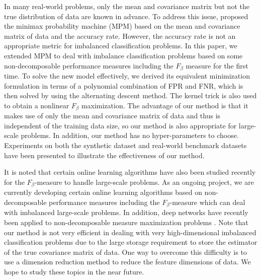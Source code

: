 \documentclass[15pt]{article}
\begin{document}
In many real-world problems, only the mean and covariance matrix but not the true distribution of data are known 
in advance. To address this issue, \cite{Lanckriet2002} proposed the minimax probability machine (MPM) based on 
the mean and covariance matrix of data and the accuracy rate. However, the accuracy rate is not an appropriate 
metric for imbalanced classification problems. In this paper, we extended MPM to deal with imbalance classification 
problems based on some non-decomposable performance measures including the $F_\beta$ measure 
for the first time. To solve the new model effectively, we derived its equivalent minimization formulation in terms 
of a polynomial combination of FPR and FNR, which is then solved by using the alternating descent method.
The kernel trick is also used to obtain a nonlinear $F_\beta$ maximization.
The advantage of our method is that it makes use of only the mean and covariance matrix of data and thus 
is independent of the training data size, so our method is also appropriate for large-scale problems.
In addition, our method has no hyper-parameters to choose.
Experiments on both the synthetic dataset and real-world benchmark datasets have been presented to
illustrate the effectiveness of our method.

It is noted that certain online learning algorithms have also been studied recently for
the $F_\beta$-measure \cite{Narasimhan2015,Busa-Fekete2015,Liu2018} to handle large-scale problems.
As an ongoing project, we are currently developing certain online learning algorithms based on non-decomposable
performance measures including the $F_\beta$-measure which can deal with imbalanced large-scale problems.
In addition, deep networks have recently been applied to non-decomposable measure maximization problems \cite{Sanyal2018}.
Note that our method is not very efficient in dealing with very high-dimensional imbalanced classification problems 
due to the large storage requirement to store the estimator of the true covariance matrix of data. 
One way to overcome this difficulty is to use a dimension reduction method to reduce the feature dimensions of data.
We hope to study these topics in the near future.


\end{document}

